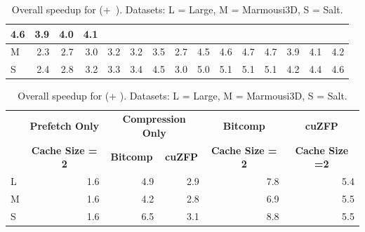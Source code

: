 \documentclass[Ingles,Final]{ic-tese-v3}
\begin{document}
\begin{table}[h!]
\begin{tabular}{|l|rrrrr|rr|rrrr|rrr|}
  4.6 &
  \multicolumn{1}{r|}{3.9} &
  \multicolumn{1}{r|}{4.0} &
  4.1 \\ \hline
\cellcolor[HTML]{C0C0C0}M &
  \multicolumn{1}{r|}{2.3} &
  \multicolumn{1}{r|}{2.7} &
  \multicolumn{1}{r|}{3.0} &
  \multicolumn{1}{r|}{3.2} &
  3.2 &
  \multicolumn{1}{r|}{3.5} &
  2.7 &
  \multicolumn{1}{r|}{4.5} &
  \multicolumn{1}{r|}{4.6} &
  \multicolumn{1}{r|}{4.7} &
  4.7 &
  \multicolumn{1}{r|}{3.9} &
  \multicolumn{1}{r|}{4.1} &
  4.2 \\ \hline
\rowcolor[HTML]{F2F2F2}\cellcolor[HTML]{C0C0C0}S &
  \multicolumn{1}{r|}{2.4} &
  \multicolumn{1}{r|}{2.8} &
  \multicolumn{1}{r|}{3.2} &
  \multicolumn{1}{r|}{3.3} &
  3.4 &
  \multicolumn{1}{r|}{4.5} &
  3.0 &
  \multicolumn{1}{r|}{5.0} &
  \multicolumn{1}{r|}{5.1} &
  \multicolumn{1}{r|}{5.1} &
  5.1 &
  \multicolumn{1}{r|}{4.2} &
  \multicolumn{1}{r|}{4.4} &
  4.6 \\ \hline
\end{tabular}
\caption[Overall speedup for \revolve (\checkpointprefetching +~\compression)]{Overall speedup for \revolve (\checkpointprefetching +~\compression). Datasets: L = Large, M = Marmousi3D, S = Salt.}
\label{tab:gpuzip_revolve_speedup}
\end{table}


\begin{table}[h!]
\centering
\begin{tabular}{|l|r|rr|r|r|}
\hline
\rowcolor[HTML]{C0C0C0} 
\multicolumn{1}{|c|}{\cellcolor[HTML]{C0C0C0}} &
  \multicolumn{1}{c|}{\cellcolor[HTML]{C0C0C0}\textbf{Prefetch Only}} &
  \multicolumn{2}{c|}{\cellcolor[HTML]{C0C0C0}\textbf{Compression Only}} &
  \multicolumn{1}{c|}{\cellcolor[HTML]{C0C0C0}\textbf{Bitcomp}} &
  \multicolumn{1}{c|}{\cellcolor[HTML]{C0C0C0}\textbf{cuZFP}} \\ \cline{2-6} 
\rowcolor[HTML]{C0C0C0} 
\multicolumn{1}{|c|}{\multirow{-2}{*}{\cellcolor[HTML]{C0C0C0}\textbf{}}} &
  \multicolumn{1}{c|}{\cellcolor[HTML]{C0C0C0}\textbf{Cache Size = 2}} &
  \multicolumn{1}{c|}{\cellcolor[HTML]{C0C0C0}\textbf{Bitcomp}} &
  \multicolumn{1}{c|}{\cellcolor[HTML]{C0C0C0}\textbf{cuZFP}} &
  \multicolumn{1}{c|}{\cellcolor[HTML]{C0C0C0}\textbf{Cache Size = 2}} &
  \multicolumn{1}{c|}{\cellcolor[HTML]{C0C0C0}\textbf{Cache Size =2}} \\ \hline
\rowcolor[HTML]{EFEFEF} 
\cellcolor[HTML]{C0C0C0}L & 1.6 & \multicolumn{1}{r|}{\cellcolor[HTML]{EFEFEF}4.9} & 2.9 & 7.8 & 5.4 \\ \hline
\cellcolor[HTML]{C0C0C0}M & 1.6 & \multicolumn{1}{r|}{4.2}                         & 2.8 & 6.9 & 5.5 \\ \hline
\rowcolor[HTML]{EFEFEF} 
\cellcolor[HTML]{C0C0C0}S & 1.6 & \multicolumn{1}{r|}{\cellcolor[HTML]{EFEFEF}6.5} & 3.1 & 8.8 & 5.5 \\ \hline
\end{tabular}
\caption[Overall speedup for \zcut (\checkpointprefetching + \compression)]{Overall speedup for \zcut (\checkpointprefetching + \compression). Datasets: L = Large, M = Marmousi3D, S = Salt. }
\label{tab:gpuzip_zcut_speedup}
\end{table}
\end{document}
